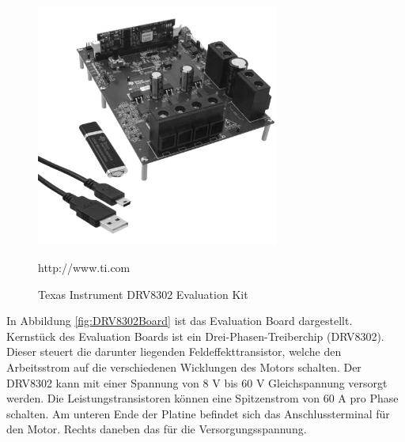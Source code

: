\begin{figure}[h]
	\centering
	\includegraphics[width=8cm]{hardware/graphics/1189086_BB_00_FB}
	\caption[DRV8302 Evaluation Kit]{Texas Instrument DRV8302 Evaluation Kit}
	\quelle http://www.ti.com
	\label{fig:DRV8302EvalKit}
\end{figure}

In Abbildung \ref{fig:DRV8302Board} ist das Evaluation Board dargestellt.
Kernstück des Evaluation Boards ist ein Drei-Phasen-Treiberchip (DRV8302).
Dieser steuert die darunter liegenden Feldeffekttransistor, welche den Arbeitsstrom auf die verschiedenen Wicklungen des Motors schalten.
Der DRV8302 kann mit einer Spannung von 8 V bis 60 V Gleichspannung versorgt werden.
Die Leistungstransistoren können eine Spitzenstrom von 60 A pro Phase schalten.
Am unteren Ende der Platine befindet sich das Anschlussterminal für den Motor.
Rechts daneben das für die Versorgungsspannung.

